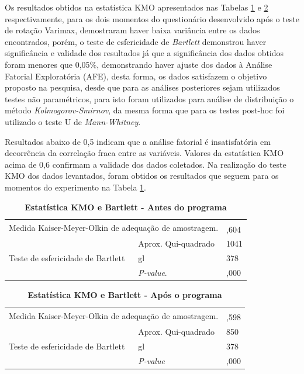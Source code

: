Os resultados obtidos na estatística KMO apresentados nas Tabelas \ref{tabela_8} e \ref{tabela_9} respectivamente, para os dois momentos do questionário desenvolvido após o teste de rotação Varimax, demostraram haver baixa variância entre os dados encontrados, porém, o teste de esfericidade de \textit{Bartlett} demonstrou haver significância e validade dos resultados já que a significância dos dados obtidos foram menores que 0,05\%, demonstrando haver ajuste dos dados à Análise Fatorial Exploratória (AFE), desta forma, os dados satisfazem o objetivo proposto na pesquisa, desde que para as análises posteriores sejam utilizados testes não paramétricos, para isto foram utilizados para análise de distribuição o método \textit{Kolmogorov-Smirnov}, da mesma forma que para os testes post-hoc foi utilizado o teste U de \textit{Mann-Whitney}.

Resultados abaixo de 0,5 indicam que a análise fatorial é insatisfatória em decorrência da correlação fraca entre as variáveis. Valores da estatística KMO acima de 0,6 confirmam a validade dos dados coletados. Na realização do teste KMO dos dados levantados, foram obtidos os resultados que seguem para os momentos do experimento na Tabela \ref{tabela_8}.

\begin{table}[H]
\FloatBarrier
\centering
\caption{\textbf{Estatística KMO e Bartlett - Antes do programa}}
\label{tabela_8}
\begin{tabular}{ll|l}
\hline\hline
\multicolumn{2}{l|}{\multirow{2}{*}{Medida Kaiser-Meyer-Olkin de adequação de amostragem.}} &  \\
\multicolumn{2}{l|}{} & ,604 \\ \hline
\multirow{3}{*}{Teste de esfericidade de Bartlett} & Aprox. Qui-quadrado & 1041 \\
 & gl & 378 \\
 & \textit{P-value}. & ,000 \\ \hline
\end{tabular}
\end{table}

\begin{table}[H]
\FloatBarrier
\centering
\caption{\textbf{Estatística KMO e Bartlett - Após o programa}}
\label{tabela_9}
\begin{tabular}{ll|l}
\hline\hline
\multicolumn{2}{l|}{\multirow{2}{*}{Medida Kaiser-Meyer-Olkin de adequação de amostragem.}} &  \\
\multicolumn{2}{l|}{} & ,598 \\ \hline
\multirow{3}{*}{Teste de esfericidade de Bartlett} & Aprox. Qui-quadrado & 850 \\
 & gl & 378 \\
 & \textit{P-value} & ,000 \\ \hline
\end{tabular}
\end{table}

